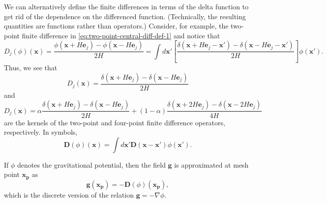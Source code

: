 We can alternatively define the finite differences in terms of the delta function to get rid of the dependence on the differenced function. (Technically, the resulting quantities are functions rather than operators.)
Consider, for example, the two-point finite difference in \autoref{eq:two-point-central-diff-def-1} and notice that
\begin{equation*}
    D_j(\phi)(\mathbf{x}) = \frac{\phi(\mathbf{x} + H \mathbf{e}_j)-\phi (\mathbf{x} - H \mathbf{e}_j)}{2H} = \int d\mathbf{x}' \left[ \frac{\delta(\mathbf{x} + H\mathbf{e}_j - \mathbf{x}') - \delta(\mathbf{x} - H\mathbf{e}_j - \mathbf{x}')}{2H} \right]\phi(\mathbf{x}').
\end{equation*}
Thus, we see that
\begin{equation}\label{eq:two-point-central-diff}
    D_j(\mathbf{x}) = \frac{\delta(\mathbf{x} + H\mathbf{e}_j) - \delta(\mathbf{x} - H\mathbf{e}_j)}{2H}
\end{equation}
and
\begin{equation}\label{eq:four-point-central-diff}
    D_j(\mathbf{x}) = \alpha\frac{\delta(\mathbf{x} + H\mathbf{e}_j) - \delta(\mathbf{x} - H\mathbf{e}_j)}{2H} + (1-\alpha)\frac{\delta(\mathbf{x} + 2H\mathbf{e}_j) - \delta(\mathbf{x} - 2H\mathbf{e}_j)}{4H}
\end{equation}
are the kernels of the two-point and four-point finite difference operators, respectively.
In symbols,
\begin{equation*}
    \mathbf{D}(\phi)(\mathbf{x}) = \int d\mathbf{x}' \mathbf{D}(\mathbf{x} - \mathbf{x}')\phi(\mathbf{x}').
\end{equation*}

If $\phi$ denotes the gravitational potential, then the field $\mathbf{g}$ is approximated at mesh point $\mathbf{x}_\mathbf{p}$ as
\begin{equation*}
    \mathbf{g}(\mathbf{x}_\mathbf{p}) = -\mathbf{D}(\phi)(\mathbf{x}_\mathbf{p}),
\end{equation*}
which is the discrete version of the relation $\mathbf{g} = -\nabla \phi$.
